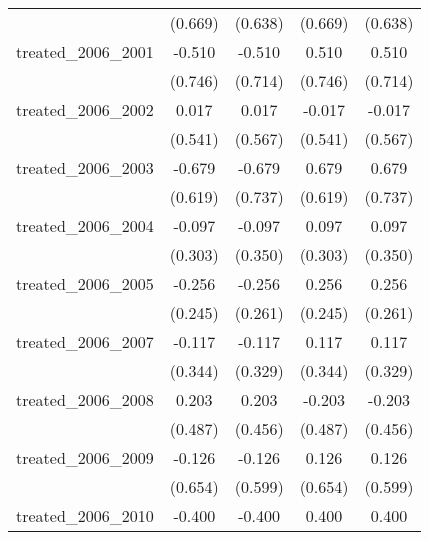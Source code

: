 {\begin{tabular}{l*{4}{c}}
            &     (0.669)         &     (0.638)         &     (0.669)         &     (0.638)         \\
[1em]
treated\_2006\_2001&      -0.510         &      -0.510         &       0.510         &       0.510         \\
            &     (0.746)         &     (0.714)         &     (0.746)         &     (0.714)         \\
[1em]
treated\_2006\_2002&       0.017         &       0.017         &      -0.017         &      -0.017         \\
            &     (0.541)         &     (0.567)         &     (0.541)         &     (0.567)         \\
[1em]
treated\_2006\_2003&      -0.679         &      -0.679         &       0.679         &       0.679         \\
            &     (0.619)         &     (0.737)         &     (0.619)         &     (0.737)         \\
[1em]
treated\_2006\_2004&      -0.097         &      -0.097         &       0.097         &       0.097         \\
            &     (0.303)         &     (0.350)         &     (0.303)         &     (0.350)         \\
[1em]
treated\_2006\_2005&      -0.256         &      -0.256         &       0.256         &       0.256         \\
            &     (0.245)         &     (0.261)         &     (0.245)         &     (0.261)         \\
[1em]
treated\_2006\_2007&      -0.117         &      -0.117         &       0.117         &       0.117         \\
            &     (0.344)         &     (0.329)         &     (0.344)         &     (0.329)         \\
[1em]
treated\_2006\_2008&       0.203         &       0.203         &      -0.203         &      -0.203         \\
            &     (0.487)         &     (0.456)         &     (0.487)         &     (0.456)         \\
[1em]
treated\_2006\_2009&      -0.126         &      -0.126         &       0.126         &       0.126         \\
            &     (0.654)         &     (0.599)         &     (0.654)         &     (0.599)         \\
[1em]
treated\_2006\_2010&      -0.400         &      -0.400         &       0.400         &       0.400         \\

\end{tabular}}
